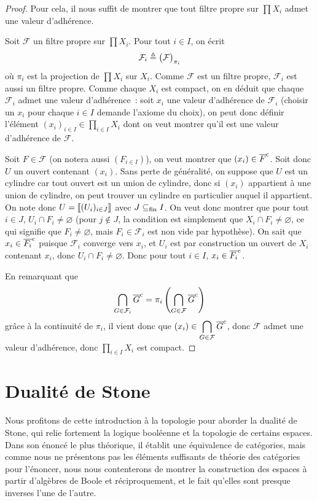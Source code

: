 \begin{proof}
  Pour cela, il nous suffit de montrer que tout filtre propre sur $\prod X_i$
  admet une valeur d'adhérence.

  Soit $\mathcal F$ un filtre propre sur $\prod X_i$. Pour tout $i\in I$, on
  écrit
  \[\mathcal F_i \triangleq \big(\mathcal F\big)_{\pi_i}\]
  où $\pi_i$ est la projection de $\prod X_i$ sur $X_i$. Comme $\mathcal F$ est
  un filtre propre, $\mathcal F_i$ est aussi un filtre propre. Comme
  chaque $X_i$ est compact, on en déduit que chaque $\mathcal F_i$ admet une
  valeur d'adhérence~: soit $x_i$ une valeur d'adhérence de $\mathcal F_i$
  (choisir un $x_i$ pour chaque $i\in I$ demande l'axiome du choix), on
  peut donc définir l'élément
  $\displaystyle (x_i)_{i\in I}\in \prod_{i \in I}X_i$
  dont on veut montrer qu'il est une valeur d'adhérence de $\mathcal F$.

  Soit $F\in \mathcal F$ (on notera aussi $(F_{i\in I})$), on veut montrer que
  $(x_i)\in \overline{F}^{\mathrm c}$. Soit donc $U$ un ouvert contenant $(x_i)$. Sans perte de
  généralité, on suppose que $U$ est un cylindre car tout ouvert est un union
  de cylindre, donc si $(x_i)$ appartient à une union de cylindre, on peut
  trouver un cylindre en particulier auquel il appartient. On note donc
  $U = \llbracket (U_i)_{i\in J}\rrbracket$ avec $J\subseteq_{\mathrm{fin}} I$. On veut donc montrer que pour
  tout $i\in J$, $U_i\cap F_i\neq\varnothing$ (pour $j\notin J$, la condition
  est simplement que $X_i \cap F_i\neq\varnothing$, ce qui signifie que
  $F_i\neq\varnothing$, mais $F_i\in\mathcal F_i$ est non vide par hypothèse).
  On sait que $x_i \in \overline{F_i}^{\mathrm c}$ puisque $\mathcal F_i$ converge vers
  $x_i$, et $U_i$ est par construction un ouvert de $X_i$ contenant $x_i$,
  donc $U_i\cap F_i \neq\varnothing$. Donc pour tout $i\in I$,
  $x_i\in \overline{F_i}^{\mathrm c}$.

  En remarquant que
  \[\bigcap_{G \in \mathcal F_i}\overline{G}^{\mathrm c} =
  \pi_i\left(\bigcap_{G \in \mathcal F} \overline{G}^{\mathrm c}\right)\]
  grâce à la continuité de $\pi_i$, il vient donc que
  $\displaystyle (x_i) \in \bigcap_{G \in\mathcal F}\overline{G}^{\mathrm c}$, donc $\mathcal F$
  admet une valeur d'adhérence, donc $\displaystyle\prod_{i\in I} X_i$ est
  compact.
\end{proof}

\section{Dualité de Stone}

Nous profitons de cette introduction à la topologie pour aborder la dualité de
Stone, qui relie fortement la logique booléenne et la topologie de certains
espaces. Dans son énoncé le plus théorique, il établit une équivalence de
catégories, mais comme nous ne présentons pas les éléments suffisants de théorie
des catégories pour l'énoncer, nous nous contenterons de montrer la construction
des espaces à partir d'algèbres de Boole et réciproquement, et le fait qu'elles
sont presque inverses l'une de l'autre.

